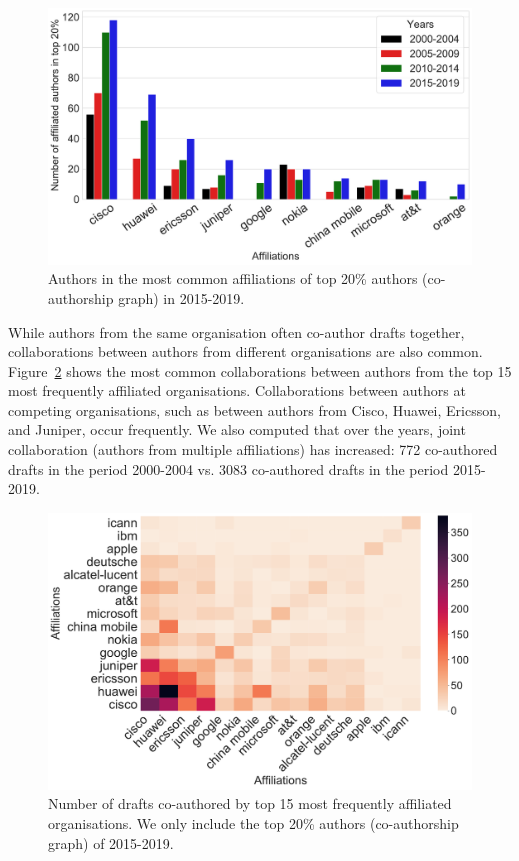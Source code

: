 \documentclass[twocolumn,10pt]{article}
\newlength{\figureWidthOneColumn}
\begin{document}
\begin{figure}
  \centering
  \includegraphics[width=\figureWidthOneColumn]{figures-prev/icwsm-2022/coauthor_affiliation_network/2019_affiliations_in_otheryears_coauthor_network.pdf}
  \caption{
    Authors in the most common affiliations of top 20\% authors
    (co-authorship graph) in 2015-2019.
  }
  \label{fig:coauthor_affiliation_network2019_otheryears}
\end{figure}

While authors from the same organisation often co-author drafts together,
collaborations between authors from different organisations are also
common.  Figure~\ref{fig:heatmap_2019_coauthordraft_most_frequent_org}
shows the most common collaborations between authors from the top 15 most
frequently affiliated organisations.  Collaborations between authors at
competing organisations, such as between authors from Cisco, Huawei,
Ericsson, and Juniper, occur frequently. We also computed that over the
years, joint collaboration (authors from multiple affiliations) has
increased: 772 co-authored drafts in the period 2000-2004 vs. 3083
co-authored drafts in the period 2015-2019.

\begin{figure}
  \centering
  \includegraphics[width=\figureWidthOneColumn]{figures-prev/icwsm-2022/coauthor_affiliation_network/heatmap_2019_top10_affiliation_collaboration.pdf}
  \caption{
    Number of drafts co-authored by top 15 most frequently affiliated
    organisations. We only include the top 20\% authors (co-authorship
    graph) of 2015-2019.
  }
  \label{fig:heatmap_2019_coauthordraft_most_frequent_org}
\end{figure}
\end{document}
